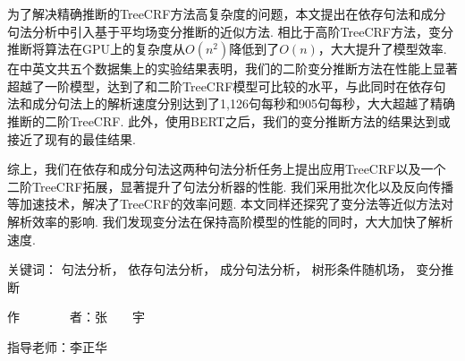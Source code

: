 \begin{cabstract}
\begin{enumerate}
		      为了解决精确推断的TreeCRF方法高复杂度的问题，本文提出在依存句法和成分句法分析中引入基于平均场变分推断的近似方法.
		      相比于高阶TreeCRF方法，变分推断将算法在GPU上的复杂度从$O(n^2)$降低到了$O(n)$，大大提升了模型效率.
		      在中英文共五个数据集上的实验结果表明，我们的二阶变分推断方法在性能上显著超越了一阶模型，达到了和二阶TreeCRF模型可比较的水平，与此同时在依存句法和成分句法上的解析速度分别达到了1,126句每秒和905句每秒，大大超越了精确推断的二阶TreeCRF.
		      此外，使用BERT之后，我们的变分推断方法的结果达到或接近了现有的最佳结果.
		      
	\end{enumerate}
	
	综上，我们在依存和成分句法这两种句法分析任务上提出应用TreeCRF以及一个二阶TreeCRF拓展，显著提升了句法分析器的性能.
	我们采用批次化以及反向传播等加速技术，解决了TreeCRF的效率问题.
	本文同样还探究了变分法等近似方法对解析效率的影响.
	我们发现变分法在保持高阶模型的性能的同时，大大加快了解析速度.
	
	\vskip 21bp
	{\heiti{} 关键词：}
	句法分析，
	依存句法分析，
	成分句法分析，
	树形条件随机场，
	变分推断
	
	\begin{flushright}
		作~~~~~~~~者：张~~~~宇
		
		指导老师：李正华
		
	\end{flushright}
\end{cabstract}


